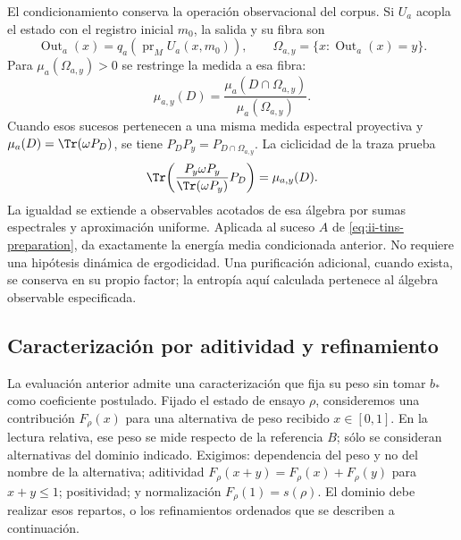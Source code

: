 El condicionamiento conserva la operación observacional del corpus. Si
$U_a$ acopla el estado con el registro inicial $m_0$, la salida y su fibra son
\[
 \operatorname{Out}_a(x)=q_a(\operatorname{pr}_M U_a(x,m_0)),\qquad
 \Omega_{a,y}=\{x:\operatorname{Out}_a(x)=y\}.
\]
Para $\mu_a(\Omega_{a,y})>0$ se restringe la medida a esa fibra:
\begin{equation}
 \mu_{a,y}(D)=\frac{\mu_a(D\cap\Omega_{a,y})}{\mu_a(\Omega_{a,y})}.
 \label{eq:ii-tins-fiber}
\end{equation}
Cuando esos sucesos pertenecen a una misma medida espectral proyectiva y
$\mu_a(D)=\Tr(\omega P_D)$, se tiene
$P_DP_y=P_{D\cap\Omega_{a,y}}$. La ciclicidad de la traza prueba
\[
 \Tr\!\left(\frac{P_y\omega P_y}{\Tr(\omega P_y)}P_D\right)
 =\mu_{a,y}(D).
\]
La igualdad se extiende a observables acotados de esa álgebra por sumas
espectrales y aproximación uniforme. Aplicada al suceso $A$ de
\eqref{eq:ii-tins-preparation}, da exactamente la energía media
condicionada anterior. No requiere una hipótesis dinámica de ergodicidad.
Una purificación adicional, cuando exista, se conserva en su propio factor;
la entropía aquí calculada pertenece al álgebra observable especificada.

\subsection{Caracterización por aditividad y refinamiento}
\label{subsec:ii-tins-aditividad}

La evaluación anterior admite una caracterización que fija su peso sin
tomar $b_*$ como coeficiente postulado. Fijado el estado de ensayo $\rho$,
consideremos una contribución $F_\rho(x)$ para una alternativa de peso
recibido $x\in[0,1]$. En la lectura relativa, ese peso se mide respecto de
la referencia $B$; sólo se consideran alternativas del dominio indicado.
Exigimos: dependencia del peso y no del nombre de la alternativa; aditividad
$F_\rho(x+y)=F_\rho(x)+F_\rho(y)$ para $x+y\le1$; positividad; y
normalización $F_\rho(1)=s(\rho)$. El dominio debe realizar esos repartos,
o los refinamientos ordenados que se describen a continuación.

